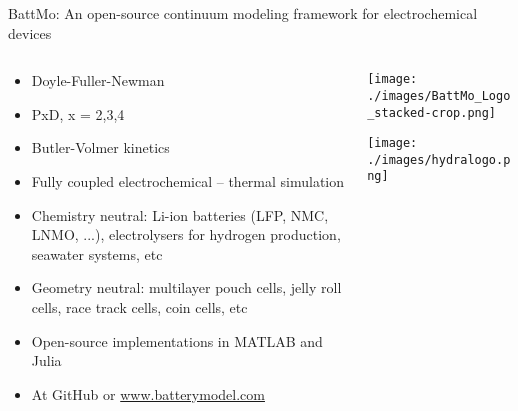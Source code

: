 \documentclass{beamer}
\begin{document}
\begin{frame}{BattMo: An open-source continuum modeling framework for electrochemical devices}

\footnotesize

  \begin{columns}
    \begin{column}{0.6\linewidth}
      \begin{itemize}
      \item Doyle-Fuller-Newman
      \item PxD, x = 2,3,4 %
      \item Butler-Volmer kinetics %
      \item Fully coupled electrochemical -- thermal simulation
      \item Chemistry neutral: Li-ion batteries (LFP, NMC, LNMO, ...), electrolysers for hydrogen production, seawater systems, etc
      \item Geometry neutral: multilayer pouch cells, jelly roll cells, race track cells, coin cells, etc
      \item Open-source implementations in MATLAB and Julia
      \item At GitHub or \url{www.batterymodel.com}
      \end{itemize}
    \end{column}
    \begin{column}{0.4\linewidth}
      \centering
      \texttt{[image: ./images/BattMo\_Logo\_stacked-crop.png]}

      \vspace{1cm}

      \texttt{[image: ./images/hydralogo.png]}

    \end{column}
  \end{columns}





\end{frame}
\end{document}
